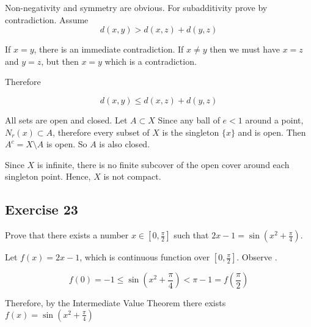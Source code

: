 \documentclass{tufte-book}
\theoremstyle{mytheoremstyle}
\theoremstyle{mylemstyle}
\theoremstyle{mydefstyle}
\begin{document}
Non-negativity and symmetry are obvious. For subadditivity prove by contradiction.  Assume
\[ d(x,y) > d(x,z) + d(y,z) \]

If $x=y$, there is an immediate contradiction.  If $x\neq y$ then we must have $x=z$ and $y=z$, but then $x=y$ which is a contradiction.

Therefore

\[ d(x,y) \leq d(x,z) + d(y,z) \]

All sets are open and closed. Let $A \subset X$  Since any ball of $e<1$ around a point, $N_r(x) \subset A$, therefore every subset of $X$ is the singleton $\{x\}$ and is open. Then $A^c = X \setminus A$ is open.  So $A$ is also closed.

Since $X$ is infinite, there is no finite subcover of the open cover around each singleton point.  Hence, $X$ is not compact.

\subsection{Exercise 23}
Prove that there exists a number $x \in [0, \frac{\pi}{2}]$ such that $2x-1 =
\sin(x^2 + \frac{\pi}{4})$.

Let $f(x) = 2x - 1$, which is continuous function over $[0, \frac{\pi}{2}]$.  Observe .

\[ f(0) = -1 \leq \sin(x^2 + \frac{\pi}{4}) < \pi - 1 = f(\frac{\pi}{2}) \]

Therefore, by the Intermediate Value Theorem there exists $f(x) = \sin(x^2 + \frac{\pi}{4})$
\end{document}
